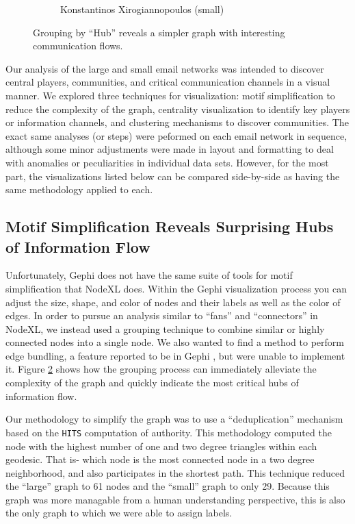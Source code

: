 \documentclass[11pt,letterpaper]{article}
\begin{document}
\begin{figure}[h]
\begin{subfigure}{0.49\textwidth}
		\caption{\textsf{Konstantinos Xirogiannopoulos (small)}}
        \label{fig:kostas_simplification}
	\end{subfigure}
    \caption{\textsf{Grouping by ``Hub'' reveals a simpler graph with interesting communication flows.}}
    \label{fig:simplification}
\end{figure}

Our analysis of the large and small email networks was intended to discover central players, communities, and critical communication channels in a visual manner. We explored three techniques for visualization: motif simplification to reduce the complexity of the graph, centrality visualization to identify key players or information channels, and clustering mechanisms to discover communities. The exact same analyses (or steps) were peformed on each email network in sequence, although some minor adjustments were made in layout and formatting to deal with anomalies or peculiarities in individual data sets. However, for the most part, the visualizations listed below can be compared side-by-side as having the same methodology applied to each.

\subsection*{Motif Simplification Reveals Surprising Hubs of Information Flow}

Unfortunately, Gephi does not have the same suite of tools for motif simplification that NodeXL does. Within the Gephi visualization process you can adjust the size, shape, and color of nodes and their labels as well as the color of edges. In order to pursue an analysis similar to ``fans'' and ``connectors'' in NodeXL, we instead used a grouping technique to combine similar or highly connected nodes into a single node. We also wanted to find a method to perform edge bundling, a feature reported to be in Gephi \cite{pupyrev_edge_2012,gansner_multilevel_2011}, but were unable to implement it. Figure \ref{fig:simplification} shows how the grouping process can immediately alleviate the complexity of the graph and quickly indicate the most critical hubs of information flow.

Our methodology to simplify the graph was to use a ``deduplication'' mechanism based on the \texttt{HITS} computation of authority. This methodology computed the node with the highest number of one and two degree triangles within each geodesic. That is- which node is the most connected node in a two degree neighborhood, and also participates in the shortest path. This technique reduced the ``large'' graph to 61 nodes and the ``small'' graph to only 29. Because this graph was more managable from a human understanding perspective, this is also the only graph to which we were able to assign labels.
\end{document}
